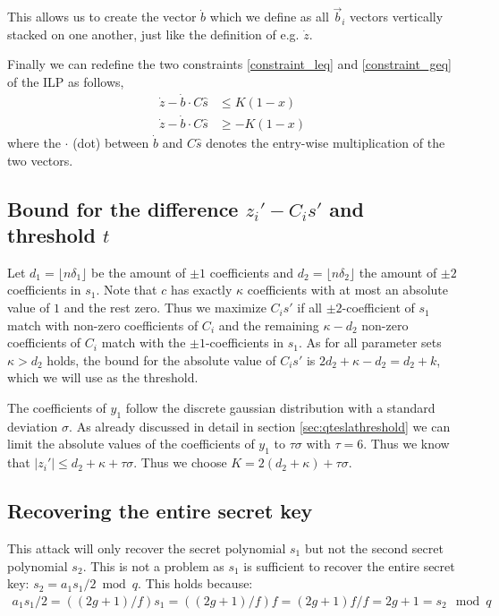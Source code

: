 This allows us to create the vector $\dot{b}$ which we define as all $\vec{b}_i$ vectors vertically stacked on one another, just like the definition of e.g.  $\dot{z}$.

Finally we can redefine the two constraints \eqref{constraint_leq} and \eqref{constraint_geq} of the ILP as follows,%
\begin{align}
	\label{constraint_leq_bliss}
	\dot{z} - \dot{b} \cdot C\hat{s} & \leq K (1 - x) \\
	\label{constraint_geq_bliss}
	\dot{z} - \dot{b} \cdot C\hat{s}  & \geq - K (1 - x)
\end{align}
where the $\cdot$ (dot) between $\dot{b}$ and $C\hat{s}$ denotes the entry-wise multiplication of the two vectors.


\subsection{Bound for the difference $z_{i}' - C_{i}s'$ and threshold $t$}
Let $d_{1} = \lfloor nδ_{1} \rfloor$ be the amount of $\pm1$ coefficients and $d_{2} =  \lfloor nδ_{2} \rfloor$ the amount of $\pm2$ coefficients in $s_1$.
Note that $c$ has exactly $κ$ coefficients with at most an absolute value of $1$ and the rest zero. Thus we maximize $C_i s'$ if all  $\pm2$-coefficient of $s_1$ match with non-zero coefficients of $C_i$ and the remaining $κ - d_2$ non-zero coefficients of $C_i$ match with the $\pm1$-coefficients in $s_1$. As for all parameter sets $κ > d_2$ holds, the bound for the absolute value of $C_i s'$ is  $2 d_{2} + κ - d_{2} = d_2 + k$,
which we will use as the threshold.

The coefficients of $y_{1}$ follow the discrete gaussian distribution with a standard deviation $σ$. As already discussed in detail in section \ref{sec:qteslathreshold} we can limit the absolute values of the coefficients of $y_{1}$ to $τ σ$ with $τ = 6$. Thus we know that $\lvert z_{i}' \rvert \leq d_{2} + κ + τ σ$. Thus we choose $K = 2 (d_{2} + κ) + τ σ$.


\subsection{Recovering the entire secret key}
This attack will only recover the secret polynomial $s_{1}$ but not the second secret polynomial $s_{2}$. This is not a problem as $s_{1}$ is sufficient to recover the entire secret key: $s_2 = a_1 s_1 / 2 \bmod q$. This holds because:
\begin{align}
	a_{1}s_{1} / 2 = ((2g+1) / f)  s_{1} =  ((2g+1) / f)  f = (2g+1) f/f = 2g+1 = s_{2} \mod{q}
\end{align}






